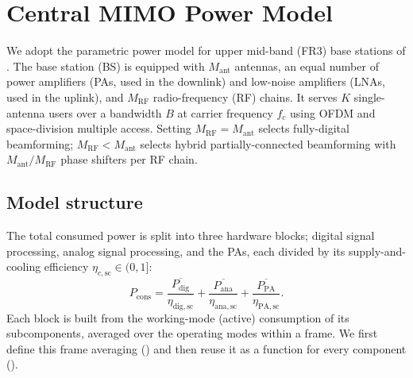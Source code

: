 \section{Central MIMO Power Model}
\label{sec:pwr_model}

We adopt the parametric power model for upper mid-band (FR3) base stations of
\cite{peschiera2026fr3}. The base station (BS) is equipped with
$M_{\mathrm{ant}}$ antennas, an equal number of power amplifiers (PAs, used in
the downlink) and low-noise amplifiers (LNAs, used in the uplink), and
$M_{\mathrm{RF}}$ radio-frequency (RF) chains. It serves $K$ single-antenna
users over a bandwidth $B$ at carrier frequency $f_c$ using OFDM and
space-division multiple access. Setting $M_{\mathrm{RF}}=M_{\mathrm{ant}}$
selects fully-digital beamforming; $M_{\mathrm{RF}}<M_{\mathrm{ant}}$ selects
hybrid partially-connected beamforming with $M_{\mathrm{ant}}/M_{\mathrm{RF}}$
phase shifters per RF chain.

\subsection{Model structure}
The total consumed power is split into three hardware blocks; digital signal
processing, analog signal processing, and the PAs, each divided by its
supply-and-cooling efficiency $\eta_{c,\mathrm{sc}}\in(0,1]$:
\begin{equation}
\label{eq:pcons}
P_{\mathrm{cons}} =
\frac{\overline{P_{\mathrm{dig}}}}{\eta_{\mathrm{dig,sc}}}
+ \frac{\overline{P_{\mathrm{ana}}}}{\eta_{\mathrm{ana,sc}}}
+ \frac{\overline{P_{\mathrm{PA}}}}{\eta_{\mathrm{PA,sc}}} .
\end{equation}
Each block is built from the working-mode (active) consumption of its
subcomponents, averaged over the operating modes within a frame. We first
define this frame averaging () and then reuse it as a
function for every component ().

